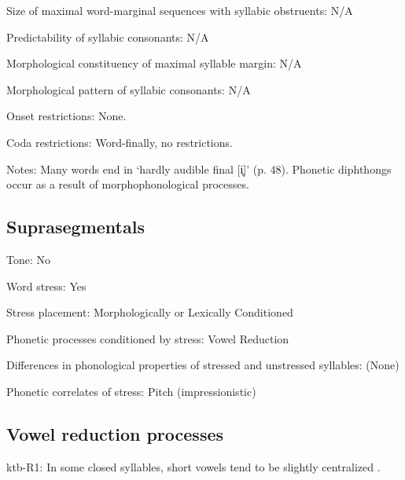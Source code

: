 {\begin{appendixdesc}
\item[Size of maximal word-marginal sequences with syllabic obstruents:] N/A

\item[Predictability of syllabic consonants:] N/A

\item[Morphological constituency of maximal syllable margin:] N/A

\item[Morphological pattern of syllabic consonants:] N/A

\item[Onset restrictions:] None.

\item[Coda restrictions:] Word-finally, no restrictions.

\item[Notes:] Many words end in ‘hardly audible final [i̥]’ (p. 48). Phonetic diphthongs occur as a result of morphophonological processes.
\end{appendixdesc}
\subsection*{Suprasegmentals}
\begin{appendixdesc}
\item[Tone:] No

\item[Word stress:] Yes

\item[Stress placement:] Morphologically or Lexically Conditioned

\item[Phonetic processes conditioned by stress:] Vowel Reduction

\item[Differences in phonological properties of stressed and unstressed syllables:] (None)

\item[Phonetic correlates of stress:] Pitch (impressionistic)
\end{appendixdesc}
\subsection*{Vowel reduction processes}
\begin{appendixdesc}

\item[ktb-R1:] In some closed syllables, short vowels tend to be slightly centralized \citep[18]{Treis2008}.


\end{appendixdesc}}
